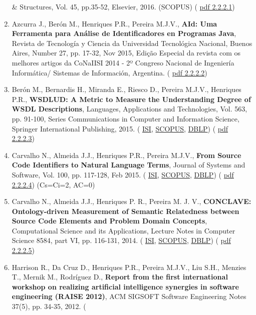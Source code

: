 \documentclass[11pt]{article}
\begin{document}
\begin{enumerate}
{\& Structures, Vol. 45, pp.35-52, Elsevier, 2016. (SCOPUS) (
\href{run:Publicacoes/publicacoes/85.pdf}{pdf 2.2.2.1})}
\item{ Azcurra J., Berón M., Henriques P.R., Pereira M.J.V.,{
\bf{ AId: Uma Ferramenta para Análise de Identificadores en Programas Java}}, Revista de Tecnología y Ciencia da Universidad Tecnológica Nacional, Buenos Aires, Number 27, pp. 17-32, Nov 2015, Edição Especial da revista com os melhores artigos da CoNaIISI 2014 - 2º Congreso Nacional de Ingeniería Informática/ Sistemas de Información, Argentina. (
\href{run:Publicacoes/publicacoes/86.pdf}{pdf 2.2.2.2}) }
\item{ Berón M., Bernardis H., Miranda E., Riesco D., Pereira M.J.V., Henriques P.R., {
\bf{ WSDLUD: A Metric to Measure the Understanding Degree of WSDL Descriptions}}, Languages, Applications and Technologies, Vol. 563, pp. 91-100, Series Communications in Computer and Information Science, Springer International Publishing, 2015. (
\href{run:Publicacoes/ComprovativosISI.pdf}{ISI}, 
\href{run:Publicacoes/PublicacoesSCOPUS.pdf}{SCOPUS}, 
\href{run:Publicacoes/ComprovativosDBLP.pdf}{DBLP}) (
\href{run:Publicacoes/publicacoes/81.pdf}{pdf 2.2.2.3}) }
\item{ Carvalho N., Almeida J.J., Henriques P.R., Pereira M.J.V., {
\bf{ From Source Code Identifiers to Natural Language Terms}}, Journal of Systems and Software, Vol. 100, pp. 117-128, Feb 2015. (
\href{run:Publicacoes/ComprovativosISI.pdf}{ISI}, 
\href{run:Publicacoes/PublicacoesSCOPUS.pdf}{SCOPUS}, 
\href{run:Publicacoes/ComprovativosDBLP.pdf}{DBLP}) (
\href{run:Publicacoes/publicacoes/79.pdf}{pdf 2.2.2.4}) (Cs=Ci=2, AC=0)}
\item{ Carvalho N., Almeida J.J., Henriques P. R., Pereira M. J. V., {
\bf{ CONCLAVE: Ontology-driven Measurement of Semantic Relatedness between Source Code Elements and Problem Domain Concepts}}, Computational Science and its Applications, Lecture Notes in Computer Science  8584, part VI, pp. 116-131, 2014. (
\href{run:Publicacoes/ComprovativosISI.pdf}{ISI}, 
\href{run:Publicacoes/PublicacoesSCOPUS.pdf}{SCOPUS}, 
\href{run:Publicacoes/ComprovativosDBLP.pdf}{DBLP}) (
\href{run:Publicacoes/publicacoes/74.pdf}{pdf 2.2.2.5})}
\item{ Harrison R., Da Cruz D., Henriques P.R., Pereira M.J.V., Liu S.H., Menzies T., Mernik M., Rodríguez D., {
\bf{ Report from the first international workshop on realizing artificial intelligence synergies in software engineering (RAISE 2012)}}, ACM SIGSOFT Software Engineering Notes 37(5), pp. 34-35, 2012. (
}
\end{enumerate}
\end{document}

